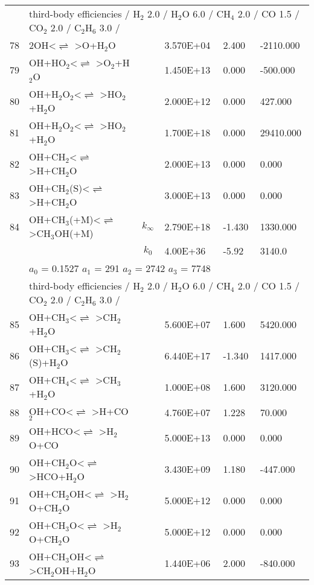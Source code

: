 \documentclass[11pt]{article}
\begin{document}
\begin{table}[hbt]
\begin{tabular}{|r l c l l l|}
	&\multicolumn{5}{l|}{third-body efficiencies  / H$_{2}$ 2.0 / H$_{2}$O 6.0 / CH$_{4}$ 2.0 / CO 1.5 / CO$_{2}$ 2.0 / C$_{2}$H$_{6}$ 3.0 /}\\ 
78 &	2OH<$\rightleftharpoons$ >O+H$_{2}$O&	&	3.570E+04&	2.400&	-2110.000\\ 
79 &	OH+HO$_{2}$<$\rightleftharpoons$ >O$_{2}$+H$_{2}$O&	&	1.450E+13&	0.000&	-500.000\\ 
80 &	OH+H$_{2}$O$_{2}$<$\rightleftharpoons$ >HO$_{2}$+H$_{2}$O&	&	2.000E+12&	0.000&	427.000\\ 
81 &	OH+H$_{2}$O$_{2}$<$\rightleftharpoons$ >HO$_{2}$+H$_{2}$O&	&	1.700E+18&	0.000&	29410.000\\ 
82 &	OH+CH$_{2}$<$\rightleftharpoons$ >H+CH$_{2}$O&	&	2.000E+13&	0.000&	0.000\\ 
83 &	OH+CH$_{2}$(S)<$\rightleftharpoons$ >H+CH$_{2}$O&	&	3.000E+13&	0.000&	0.000\\ 
84 &	OH+CH$_{3}$(+M)<$\rightleftharpoons$ >CH$_{3}$OH(+M)&	$k_{\infty}$&	2.790E+18&	-1.430&	1330.000\\ 
	&	&	$k_0$&	4.00E+36&-5.92&	 3140.0\\ 
	&\multicolumn{5}{l|}{	$a_0$ = 0.1527	$a_1$ = 291	$a_2$ = 2742	$a_3$ = 7748}\\ 
	&\multicolumn{5}{l|}{third-body efficiencies  / H$_{2}$ 2.0 / H$_{2}$O 6.0 / CH$_{4}$ 2.0 / CO 1.5 / CO$_{2}$ 2.0 / C$_{2}$H$_{6}$ 3.0 /}\\ 
85 &	OH+CH$_{3}$<$\rightleftharpoons$ >CH$_{2}$+H$_{2}$O&	&	5.600E+07&	1.600&	5420.000\\ 
86 &	OH+CH$_{3}$<$\rightleftharpoons$ >CH$_{2}$(S)+H$_{2}$O&	&	6.440E+17&	-1.340&	1417.000\\ 
87 &	OH+CH$_{4}$<$\rightleftharpoons$ >CH$_{3}$+H$_{2}$O&	&	1.000E+08&	1.600&	3120.000\\ 
88 &	OH+CO<$\rightleftharpoons$ >H+CO$_{2}$&	&	4.760E+07&	1.228&	70.000\\ 
89 &	OH+HCO<$\rightleftharpoons$ >H$_{2}$O+CO&	&	5.000E+13&	0.000&	0.000\\ 
90 &	OH+CH$_{2}$O<$\rightleftharpoons$ >HCO+H$_{2}$O&	&	3.430E+09&	1.180&	-447.000\\ 
91 &	OH+CH$_{2}$OH<$\rightleftharpoons$ >H$_{2}$O+CH$_{2}$O&	&	5.000E+12&	0.000&	0.000\\ 
92 &	OH+CH$_{3}$O<$\rightleftharpoons$ >H$_{2}$O+CH$_{2}$O&	&	5.000E+12&	0.000&	0.000\\ 
93 &	OH+CH$_{3}$OH<$\rightleftharpoons$ >CH$_{2}$OH+H$_{2}$O&	&	1.440E+06&	2.000&	-840.000\\ 

\end{tabular}
\end{table}
\end{document}
